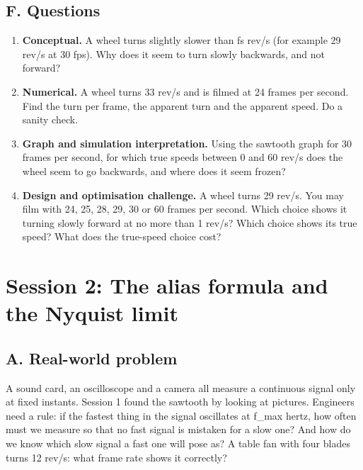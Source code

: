 \documentclass[11pt,a4paper]{article}
\begin{document}
\subsection*{F. Questions}
\begin{enumerate}[nosep]
\item \textbf{Conceptual.} A wheel turns slightly slower than fs rev/s (for example 29 rev/s at 30 fps). Why does it seem to turn slowly backwards, and not forward?
\item \textbf{Numerical.} A wheel turns 33 rev/s and is filmed at 24 frames per second. Find the turn per frame, the apparent turn and the apparent speed. Do a sanity check.
\item \textbf{Graph and simulation interpretation.} Using the sawtooth graph for 30 frames per second, for which true speeds between 0 and 60 rev/s does the wheel seem to go backwards, and where does it seem frozen?
\item \textbf{Design and optimisation challenge.} A wheel turns 29 rev/s. You may film with 24, 25, 28, 29, 30 or 60 frames per second. Which choice shows it turning slowly forward at no more than 1 rev/s? Which choice shows its true speed? What does the true-speed choice cost?
\end{enumerate}

\section{Session 2: The alias formula and the Nyquist limit}

\subsection*{A. Real-world problem}
A sound card, an oscilloscope and a camera all measure a continuous signal only at fixed instants. Session 1 found the sawtooth by looking at pictures. Engineers need a rule: if the fastest thing in the signal oscillates at f\_max hertz, how often must we measure so that no fast signal is mistaken for a slow one? And how do we know which slow signal a fast one will pose as? A table fan with four blades turns 12 rev/s: what frame rate shows it correctly?
\end{document}
